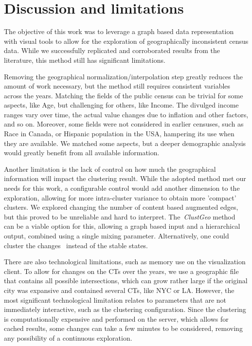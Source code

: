 \section{Discussion and limitations}

The objective of this work was to leverage a graph based data representation
with visual tools to allow for the exploration of geographically inconsistent
census data. While we successfully replicated and corroborated results from the
literature, this method still has significant limitations. 

Removing the geographical normalization/interpolation step greatly reduces the
amount of work necessary, but the method still requires consistent variables
across the years. Matching the fields of the public census can be trivial for
some aspects, like Age, but challenging for others, like Income. The divulged
income ranges vary over time, the actual value changes due to inflation and
other factors, and so on. Moreover, some fields were not considered in earlier
censuses, such as Race in Canada, or Hispanic population in the USA, hampering its
use when they are available. We matched some aspects, but a deeper demographic
analysis would greatly benefit from all available information.


Another limitation is the lack of control on how much the geographical
information will impact the clustering result. While the adopted method met our
needs for this work, a configurable control would add another dimension to the
exploration, allowing for more intra-cluster variance to obtain more 'compact'
clusters. We explored changing the number of content based augmented edges, but
this proved to be unreliable and hard to interpret. The~\emph{ClustGeo}
method~\cite{Chavent2017} can be a viable option for this, allowing a graph
based input and a hierarchical output, combined using a single mixing
parameter. Alternatively, one could cluster the changes~\cite{bian2018survey}
instead of the stable states.


There are also technological limitations, such as memory use on the
visualization client. To allow for changes on the CTs over the years, we use a
geographic file that contains all possible intersections, which can grow rather
large if the original city was expansive and contained several CTs, like NYC or
LA. However, the most significant technological limitation relates to parameters
that are not immediately interactive, such as the clustering configuration.
Since the clustering is computationally expensive and performed on the server,
which allows for cached results, some changes can take a few minutes to be
considered, removing any possibility of a continuous exploration. 


